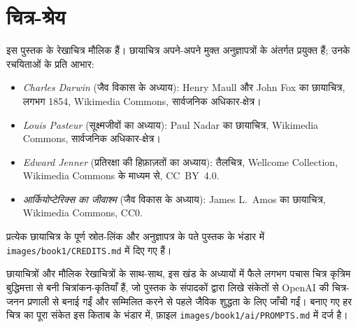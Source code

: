 \chapter*{चित्र-श्रेय}

इस पुस्तक के रेखाचित्र मौलिक हैं। छायाचित्र अपने-अपने मुक्त अनुज्ञापत्रों के
अंतर्गत प्रयुक्त हैं; उनके रचयिताओं के प्रति आभार:

\begin{itemize}
  \item \emph{Charles Darwin} (जैव विकास के अध्याय): Henry Maull और
        John Fox का छायाचित्र, लगभग 1854, Wikimedia Commons,
        सार्वजनिक अधिकार-क्षेत्र।
  \item \emph{Louis Pasteur} (सूक्ष्मजीवों का अध्याय): Paul Nadar का
        छायाचित्र, Wikimedia Commons, सार्वजनिक अधिकार-क्षेत्र।
  \item \emph{Edward Jenner} (प्रतिरक्षा की हिफ़ाज़तों का अध्याय): तैलचित्र,
        Wellcome Collection, Wikimedia Commons के माध्यम से,
        CC~BY~4.0.
  \item \emph{आर्कियोप्टेरिक्स का जीवाश्म} (जैव विकास के अध्याय):
        James L.~Amos का छायाचित्र, Wikimedia Commons, CC0.
\end{itemize}

प्रत्येक छायाचित्र के पूर्ण स्रोत-लिंक और अनुज्ञापत्र के पते पुस्तक के
भंडार में \texttt{images/book1/CREDITS.md} में दिए गए हैं।

\bigskip
छायाचित्रों और मौलिक रेखाचित्रों के साथ-साथ, इस खंड के अध्यायों में फैले
लगभग पचास चित्र कृत्रिम बुद्धिमत्ता से बनी चित्रांकन-कृतियाँ हैं, जो
पुस्तक के संपादकों द्वारा लिखे संकेतों से OpenAI की चित्र-जनन प्रणाली से
बनाई गईं और सम्मिलित करने से पहले जैविक शुद्धता के लिए जाँची गईं।
बनाए गए हर चित्र का पूरा संकेत इस किताब के भंडार में, फ़ाइल
\texttt{images/book1/ai/PROMPTS.md} में दर्ज है।
\clearpage
